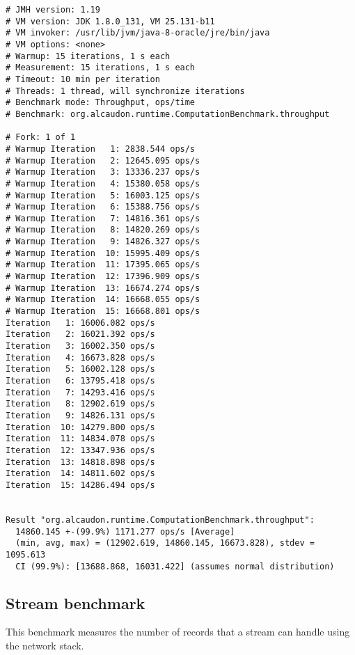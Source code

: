 \begin{lstlisting}
# JMH version: 1.19
# VM version: JDK 1.8.0_131, VM 25.131-b11
# VM invoker: /usr/lib/jvm/java-8-oracle/jre/bin/java
# VM options: <none>
# Warmup: 15 iterations, 1 s each
# Measurement: 15 iterations, 1 s each
# Timeout: 10 min per iteration
# Threads: 1 thread, will synchronize iterations
# Benchmark mode: Throughput, ops/time
# Benchmark: org.alcaudon.runtime.ComputationBenchmark.throughput

# Fork: 1 of 1
# Warmup Iteration   1: 2838.544 ops/s
# Warmup Iteration   2: 12645.095 ops/s
# Warmup Iteration   3: 13336.237 ops/s
# Warmup Iteration   4: 15380.058 ops/s
# Warmup Iteration   5: 16003.125 ops/s
# Warmup Iteration   6: 15388.756 ops/s
# Warmup Iteration   7: 14816.361 ops/s
# Warmup Iteration   8: 14820.269 ops/s
# Warmup Iteration   9: 14826.327 ops/s
# Warmup Iteration  10: 15995.409 ops/s
# Warmup Iteration  11: 17395.065 ops/s
# Warmup Iteration  12: 17396.909 ops/s
# Warmup Iteration  13: 16674.274 ops/s
# Warmup Iteration  14: 16668.055 ops/s
# Warmup Iteration  15: 16668.801 ops/s
Iteration   1: 16006.082 ops/s
Iteration   2: 16021.392 ops/s
Iteration   3: 16002.350 ops/s
Iteration   4: 16673.828 ops/s
Iteration   5: 16002.128 ops/s
Iteration   6: 13795.418 ops/s
Iteration   7: 14293.416 ops/s
Iteration   8: 12902.619 ops/s
Iteration   9: 14826.131 ops/s
Iteration  10: 14279.800 ops/s
Iteration  11: 14834.078 ops/s
Iteration  12: 13347.936 ops/s
Iteration  13: 14818.898 ops/s
Iteration  14: 14811.602 ops/s
Iteration  15: 14286.494 ops/s


Result "org.alcaudon.runtime.ComputationBenchmark.throughput":
  14860.145 +-(99.9%) 1171.277 ops/s [Average]
  (min, avg, max) = (12902.619, 14860.145, 16673.828), stdev = 1095.613
  CI (99.9%): [13688.868, 16031.422] (assumes normal distribution)
\end{lstlisting}

\subsection{Stream benchmark}

This benchmark measures the number of records that a stream can handle using
the network stack.

